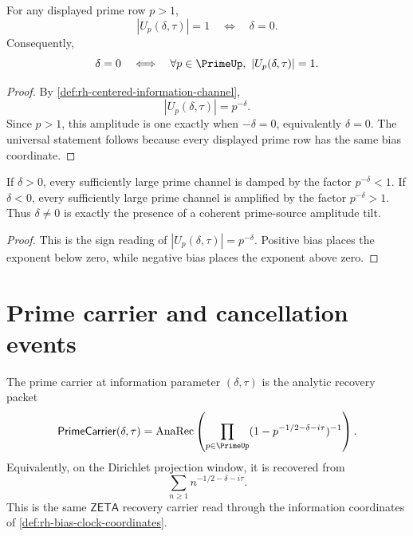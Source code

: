 \begin{proposition}
\label{prop:rh-zero-bias-unit-channel-amplitude}
For any displayed prime row $p>1$,
$$
|U_p(\delta,\tau)|=1
\quad\Longleftrightarrow\quad
\delta=0.
$$
Consequently,
$$
\delta=0
\quad\Longleftrightarrow\quad
\forall p\in\PrimeUp,\ |U_p(\delta,\tau)|=1.
$$
\end{proposition}

\begin{proof}
By \autoref{def:rh-centered-information-channel},
$$
|U_p(\delta,\tau)|=p^{-\delta}.
$$
Since $p>1$, this amplitude is one exactly when $-\delta=0$, equivalently
$\delta=0$.  The universal statement follows because every displayed prime
row has the same bias coordinate.
\end{proof}

\begin{corollary}
\label{cor:rh-amplitude-bias-prime-source-tilt}
If $\delta>0$, every sufficiently large prime channel is damped by the factor
$p^{-\delta}<1$.  If $\delta<0$, every sufficiently large prime channel is
amplified by the factor $p^{-\delta}>1$.  Thus $\delta\neq 0$ is exactly the
presence of a coherent prime-source amplitude tilt.
\end{corollary}

\begin{proof}
This is the sign reading of $|U_p(\delta,\tau)|=p^{-\delta}$.  Positive bias
places the exponent below zero, while negative bias places the exponent above
zero.
\end{proof}

\section{Prime carrier and cancellation events}
\label{sec:rh-prime-carrier-cancellation-events}

\begin{definition}
\label{def:rh-prime-carrier}
The prime carrier at information parameter $(\delta,\tau)$ is the analytic
recovery packet
$$
\mathsf{PrimeCarrier}(\delta,\tau)
=
\operatorname{AnaRec}
\left(
\prod_{p\in\PrimeUp}
(1-p^{-1/2-\delta-i\tau})^{-1}
\right).
$$
Equivalently, on the Dirichlet projection window, it is recovered from
$$
\sum_{n\geq 1}n^{-1/2-\delta-i\tau}.
$$
This is the same $\mathsf{ZETA}$ recovery carrier read through the
information coordinates of \autoref{def:rh-bias-clock-coordinates}.
\end{definition}

